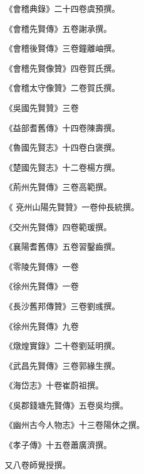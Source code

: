 \begin{pinyinscope}
 《會稽典錄》二十四卷虞預撰。



 《會稽先賢傳》五卷謝承撰。



 《會稽後賢傳》三卷鐘離岫撰。



 《會稽先賢像贊》四卷賀氏撰。



 《會稽太守像贊》二卷賀氏撰。



 《吳國先賢贊》三卷



 《益部耆舊傳》十四卷陳壽撰。



 《魯國先賢志》十四卷白褒撰。



 《楚國先賢志》十二卷楊方撰。



 《荊州先賢傳》三卷高範撰。



 《
 兗州山陽先賢贊》一卷仲長統撰。



 《交州先賢傳》四卷範瑗撰。



 《襄陽耆舊傳》五卷習鑿齒撰。



 《零陵先賢傳》一卷



 《徐州先賢傳》一卷



 《長沙舊邦傳贊》三卷劉彧撰。



 《徐州先賢傳》九卷



 《燉煌實錄》二十卷劉延明撰。



 《武昌先賢傳》三卷郭緣生撰。



 《海岱志》十卷崔蔚祖撰。



 《吳郡錢塘先賢傳》五卷吳均撰。



 《幽州古今人物志》十三卷陽休之撰。



 《孝子傳》十五卷蕭廣濟撰。



 又八卷師覺授撰。




\end{pinyinscope}
